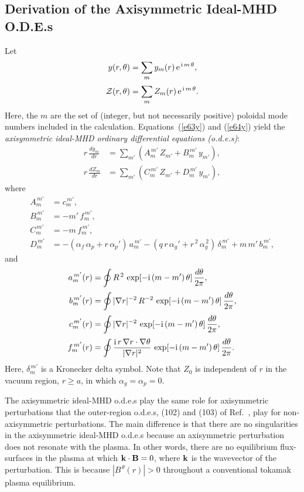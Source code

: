 \documentclass[12pt,prb,aps]{revtex4-1}
\begin{document}
\subsection{Derivation of the Axisymmetric Ideal-MHD O.D.E.s}\label{ode}
Let
\begin{align}\label{e62s}
y(r,\theta)&= \sum_m y_m(r)\,{\rm e}^{\,{\rm i}\,m\,\theta},\\[0.5ex]
{\cal Z}(r,\theta) &= \sum_m Z_m(r)\,{\rm e}^{\,{\rm i}\,m\,\theta}.\label{e63s}
\end{align}
Here, the $m$ are the set of (integer, but not necessarily positive) poloidal mode numbers included in the calculation. 
Equations~(\ref{e63y}) and (\ref{e64y}) yield the {\em axisymmetric ideal-MHD ordinary differential equations (o.d.e.s)}:
\begin{align}\label{e69u}
r\,\frac{dy_m}{dr}&= \sum_{m'}\left(A_{m}^{\,m'}\,Z_{m'} + B_{m}^{\,m'}\,y_{m'}\right),\\[0.5ex]
r\,\frac{dZ_m}{dr}&= \sum_{m'}\left(C_{m}^{\,m'}\,Z_{m'} + D_{m}^{\,m'}\,y_{m'}\right),\label{e70uu}
\end{align}
where
\begin{align}
A_m^{\,m'} &= c_{m}^{\,m'},\\[0.5ex]
B_m^{\,m'} &= - m'\,f_m^{\,m'},\\[0.5ex]
C_{m}^{\,m'} &= -m\,f_m^{\,m'},\\[0.5ex]
D_{m}^{\,m'}&= -(\alpha_f\,\alpha_p+ r\,\alpha_p')\,a_m^{\,m'} - (q\,r\,\alpha_g' +r^{\,2}\,\alpha_g^{\,2})\,\delta_m^{\,m'}+m\,m'\,b_m^{\,m'},\label{Ddef}
\end{align}
and
\begin{align}\label{e73er}
a_m^{\,m'}(r)  &=\oint R^{\,2}\,\exp[-{\rm i}\,(m-m')\,\theta]\,\frac{d\theta}{2\pi},\\[0.5ex]
b_m^{\,m'}(r)  &=\oint|\nabla r|^{-2}\, R^{-2}\,\exp[-{\rm i}\,(m-m')\,\theta]\,\frac{d\theta}{2\pi},\\[0.5ex]
c_m^{\,m'}(r)  &=\oint|\nabla r|^{-2}\,\exp[-{\rm i}\,(m-m')\,\theta]\,\frac{d\theta}{2\pi},\\[0.5ex]
f_{m}^{\,m'}(r)&= \oint \frac{{\rm i}\,r\,\nabla r\cdot\nabla\theta}{|\nabla r|^2}\,\exp[-{\rm i}\,(m-m')\,\theta]\,\frac{d\theta}{2\pi}.\label{e76er}
\end{align}
Here, $\delta_m^{\,m'}$ is a Kronecker delta symbol. Note that $Z_0$ is independent of $r$ in the vacuum region, $r\geq a$,  in which
$\alpha_g=\alpha_p=0$. 

The axisymmetric ideal-MHD o.d.e.s play the same role for axisymmetric perturbations that the outer-region o.d.e.s, (102) and (103) of Ref.~, play for
non-axisymmetric perturbations. The main difference is that there are no singularities in the axisymmetric ideal-MHD o.d.e.s because an axisymmetric perturbation 
does not resonate with the plasma. In other words, there are no equilibrium flux-surfaces in the plasma at which ${\bf k}\cdot{\bf B}=0$, where ${\bf k}$ is the
wavevector of the perturbation. This is because $|B^{\,\theta}(r)|>0$ throughout a conventional tokamak plasma equilibrium. 
\end{document}
